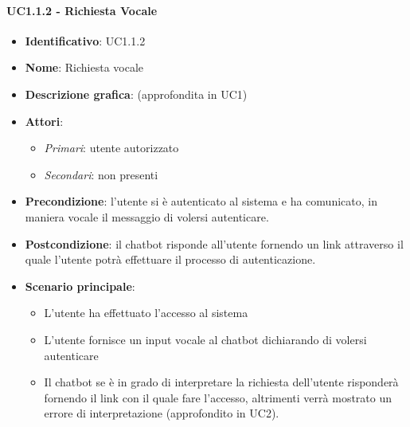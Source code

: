 \paragraph{UC1.1.2 - Richiesta Vocale}
\begin{itemize}
   \item \textbf{Identificativo}: UC1.1.2
   \item \textbf{Nome}: Richiesta vocale
   \item \textbf{Descrizione grafica}: (approfondita in UC1)
   \item \textbf{Attori}:
   \begin{itemize} 
       \item \textit{Primari}: utente autorizzato
       \item \textit{Secondari}: non presenti
   \end{itemize}
       \item \textbf{Precondizione}: l'utente si è autenticato al sistema e ha comunicato, in maniera vocale il messaggio di volersi autenticare. 
       \item \textbf{Postcondizione}: il chatbot risponde all'utente fornendo un link attraverso il quale l'utente potrà effettuare il processo di autenticazione.  
    \item \textbf{Scenario principale}: 
       \begin{itemize}
           \item L'utente ha effettuato l'accesso al sistema 
           \item L'utente fornisce un input vocale al chatbot dichiarando di volersi autenticare 
           \item Il chatbot se è in grado di interpretare la richiesta dell'utente risponderà fornendo il link con il quale fare l'accesso, altrimenti verrà mostrato un errore di interpretazione (approfondito in UC2).
       \end{itemize}
\end{itemize}

